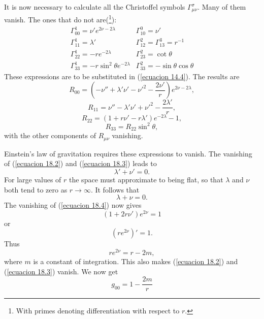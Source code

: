 It is now necessary to calculate all the Christoffel symbols $\Gamma^\sigma_{\mu\nu}$. Many of them vanish. The ones 
that do not are(\footnote{With primes denoting differentiation with respect to $r$.}):
\[
 \begin{array}{ll}
   \Gamma^1_{00} = \nu' e^{2\nu - 2 \lambda}       & \Gamma^0_{10} =  \nu' \\
   \Gamma^1_{11} = \lambda'                        & \Gamma^2_{12} = \Gamma^3_{13} = r^{-1}\\
   \Gamma^1_{22} = - r e^{-2\lambda}               & \Gamma^2_{23} = \cot \theta \\
   \Gamma^1_{33} = - r \sin^2 \theta e^{-2\lambda} & \Gamma^2_{33} = - \sin \theta \cos \theta
 \end{array}
\]
These expressions are to be substituted in (\ref{ecuacion 14.4}). The results are
\begin{equation}
 \label{ecuacion 18.2}
 R_{00} = \left( - \nu'' + \lambda' \nu' - {\nu'}^2 - \frac{2 \nu'}{r} \right) e^{2 \nu - 2 \lambda},
\end{equation}
\begin{equation}
 \label{ecuacion 18.3}
 R_{11} = \nu'' - \lambda' \nu' + {\nu'}^2 - \frac{2 \lambda'}{r},
\end{equation}
\begin{equation}
 \label{ecuacion 18.4}
 R_{22} = (1 + r \nu' - r \lambda' ) e^{-2\lambda} -1,
\end{equation}
\[
 R_{33} = R_{22} \sin^2 \theta,
\]
with the other components of $R_{\mu\nu}$ vanishing.

Einstein's law of gravitation requires these expressions to vanish. The vanishing of (\ref{ecuacion 18.2}) and 
(\ref{ecuacion 18.3}) leads to
\[
 \lambda' + \nu' = 0. 
\]
For large values of $r$ the space must approximate to being flat, so that $\lambda$ and $\nu$ both tend to zero as 
$r\rightarrow \infty$. It follows that
\[
 \lambda + \nu = 0.
\]
The vanishing of (\ref{ecuacion 18.4}) now gives
\[
 (1 + 2 r \nu') e^{2\nu} = 1
\]
or
\[
 \left( r e^{2\nu}\right)' = 1.
\]
Thus 
\[
 r e^{2\nu} = r - 2m,
\]
where $m$ is a constant of integration. This also makes (\ref{ecuacion 18.2}) and (\ref{ecuacion 18.3}) vanish. We now 
get
\begin{equation}
 \label{ecuacion 18.5}
 g_{00} = 1 - \frac{2 m}{r}
\end{equation}




